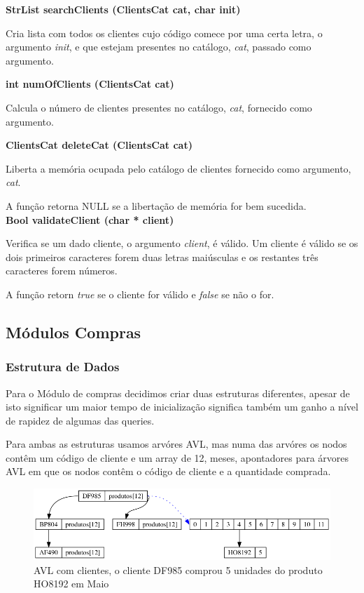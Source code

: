 \documentclass[10pt] {article}
\begin{document}
\noindent \textbf{StrList searchClients (ClientsCat cat, char init)}
\par Cria lista com todos os clientes cujo código comece por uma certa letra, o argumento \emph{init}, e que
estejam presentes no catálogo, \emph{cat}, passado como argumento.

\noindent \textbf{int numOfClients (ClientsCat cat)}
\par Calcula o número de clientes presentes no catálogo, \emph{cat}, fornecido como argumento.

\noindent \textbf{ClientsCat deleteCat (ClientsCat cat)}
\par Liberta a memória ocupada pelo catálogo de clientes fornecido como argumento, \emph{cat}.
\par A função retorna NULL se a libertação de memória for bem sucedida. \\

\noindent \textbf{Bool validateClient (char * client)}
\par Verifica se um dado cliente, o argumento \emph{client}, é válido. Um cliente é válido se os dois primeiros
caracteres forem duas letras maiúsculas e os restantes três caracteres forem números.
\par A função retorn \emph{true} se o cliente for válido e \emph{false} se não o for.

\subsection{Módulos Compras}

\subsubsection{Estrutura de Dados}
\indent\par Para o Módulo de compras decidimos criar duas estruturas diferentes, apesar de isto significar um maior 
tempo  de inicialização significa também um ganho a nível de rapidez de algumas das queries.
 \par Para ambas as estruturas usamos arvóres AVL, mas numa das arvóres os nodos contêm um código de cliente 
 e um array de 12, meses, apontadores para árvores AVL em que os nodos contêm o código de cliente e a 
 quantidade comprada.
 
\begin{figure}[ht!]
\centering
\includegraphics[width=120mm]{avl_salesc.png}
\caption{AVL com clientes, o cliente DF985 comprou 5 unidades do produto HO8192 em Maio}
\end{figure}
\end{document}
